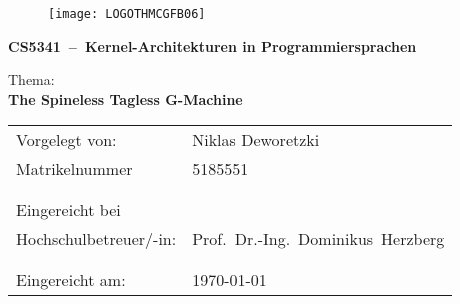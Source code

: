 \documentclass[12pt]{report}
\newcommand{\MyName}{Niklas Deworetzki}
\newcommand{\MyTitle}{CS5341~--~Kernel-Architekturen in Programmiersprachen}
\newcommand{\MyTopic}{The Spineless Tagless G-Machine}        %
\renewcommand\_{\textunderscore\allowbreak}
\begin{document}
\pagestyle{empty}


\begin{titlepage}
  \begin{center}
    \begin{figure}
      \texttt{[image: LOGO\_THM\_CG\_FB06]}
    \end{figure}
  \end{center}
  \Large
  \begin{center}
    \vspace{1cm}
    \textbf{\MyTitle{}}\linebreak
    \vspace{1cm}
  \end{center}
  \large
  Thema:\\
  \textbf{\MyTopic{}}

  \normalsize
  \vfill
  \begin{center}
    \begin{tabular*}{0.75\textwidth}%
      {@{\extracolsep{\fill}}ll}

      {Vorgelegt von:} & {\MyName{}}\\
      {Matrikelnummer} & {5185551}\\
      {} & {}\\
      {} & {}\\
      {Eingereicht bei} & {}\\
      {Hochschulbetreuer/-in:} & {Prof.\ Dr.-Ing.\ Dominikus\ Herzberg}\\
      {} & {}\\
      {} & {}\\
      {Eingereicht am:} & {\today}

    \end{tabular*}
  \end{center}

  \vfill
\end{titlepage}

\addtocounter{page}{1}
\pagestyle{fancy}

\tableofcontents

\setcounter{savepage}{\number\value{page}}
\newpage












\addtocounter{savepage}{1}
\setcounter{page}{\value{savepage}}

\listoffigures

\printbibliography[heading=bibintoc, title=Literaturverzeichnis]{}

\appendix
\end{document}

